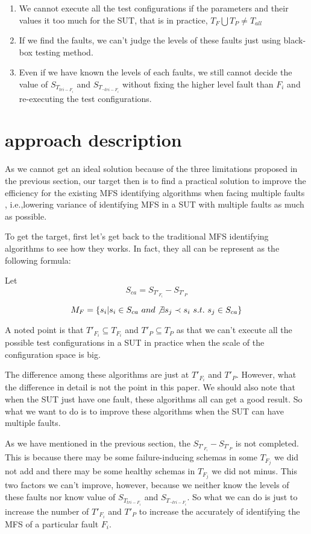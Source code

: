 \documentclass{sig-alternate}
\begin{document}
\begin{enumerate}
 \item We cannot execute all the test configurations if the parameters and their values it too much for the SUT, that is in practice, $T_{F}\bigcup T_{P} \neq T_{all}$

 \item If we find the faults, we can't judge the levels of these faults just using black-box testing method.

 \item Even if we have known the levels of each faults, we still cannot decide the value of $S_{T_{tri-F_{i}}}$ and  $S_{T_{\neg tri-F_{i}}}$ without fixing the higher level fault than $F_{i}$ and re-executing the test configurations.
\end{enumerate}


\section{approach description}

As we cannot get an ideal solution because of the three limitations proposed in the previous section, our target then is to find a practical solution to improve the efficiency for the existing MFS identifying algorithms when facing multiple faults , i.e.,lowering variance of identifying  MFS in a SUT with multiple faults as much as possible.

To get the target, first let's get back to the traditional MFS identifying algorithms to see how they works. In fact, they all can be represent as the following formula:

Let $$S_{ca} = S_{T'_{F_{i}}} - S_{T'_{P}}$$

$$M_{F} = \{s_{i} | s_{i} \in S_{ca}\ and \not\exists s_{j} \prec s_{i}\ s.t.\ s_{j} \in S_{ca} \}$$

A noted point is that  $ T'_{F_{i}} \subseteq T_{F_{i}} $ and $ T'_{P} \subseteq T_{P} $ as that we can't execute all the possible test configurations in a SUT in practice when the scale of the configuration space is big.

The difference among these algorithms are just at $T'_{F_{i}}$ and  $T'_{P}$. However, what the difference in detail is not the point in this paper. We should also note that when the SUT just have one fault, these algorithms all can get a good result. So what we want to do is to improve these algorithms when the SUT can have multiple faults.

As we have mentioned in the previous section, the $S_{T'_{F_{i}}} - S_{T'_{P}}$ is not completed. This is because there may be some failure-inducing schemas in some $T_{F_{j}}$ we did not add and there may be some healthy schemas in $T_{F_{j}}$ we did not minus. This two factors we can't improve, however, because we neither know the levels of these faults nor know value of $S_{T_{tri-F_{i}}}$ and  $S_{T_{\neg tri-F_{i}}}$. So what we can do is just to increase the number of $T'_{F_{i}}$ and $T'_{P}$ to increase the accurately of identifying the MFS of a particular fault $F_{i}$.
\end{document}
